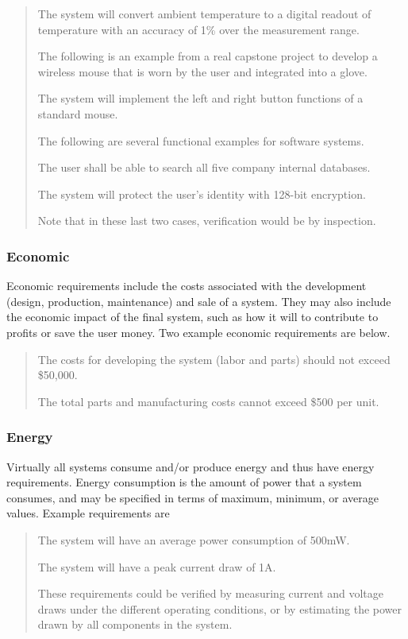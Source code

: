 \begin{quote}
The system will convert ambient temperature to a digital readout of
temperature with an accuracy of 1\% over the measurement range.

The following is an example from a real capstone project to develop a
wireless mouse that is worn by the user and integrated into a glove.

The system will implement the left and right button functions of a
standard mouse.

The following are several functional examples for software systems.

The user shall be able to search all five company internal databases.

The system will protect the user's identity with 128-bit encryption.

Note that in these last two cases, verification would be by inspection.
\end{quote}

\subsubsection*{Economic}\label{economic}

Economic requirements include the costs associated with the development
(design, production, maintenance) and sale of a system. They may also
include the economic impact of the final system, such as how it will to
contribute to profits or save the user money. Two example economic
requirements are below.

\begin{quote}
The costs for developing the system (labor and parts) should not exceed
\$50,000.

The total parts and manufacturing costs cannot exceed \$500 per unit.
\end{quote}

\subsubsection*{Energy}\label{energy}

Virtually all systems consume and/or produce energy and thus have energy
requirements. Energy consumption is the amount of power that a system
consumes, and may be specified in terms of maximum, minimum, or average
values. Example requirements are

\begin{quote}
The system will have an average power consumption of 500mW.

The system will have a peak current draw of 1A.

These requirements could be verified by measuring current and voltage
draws under the different operating conditions, or by estimating the
power drawn by all components in the system.
\end{quote}

